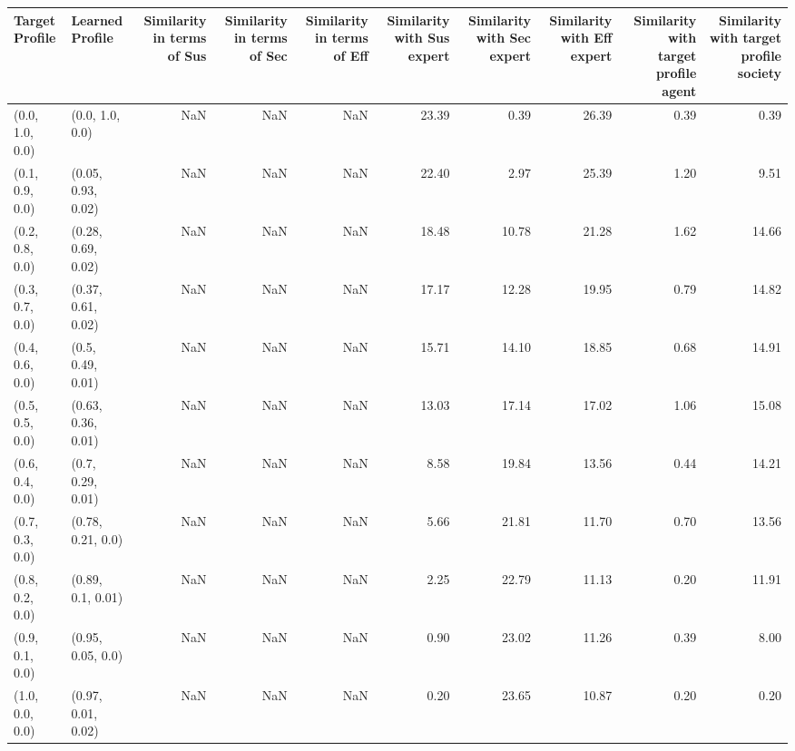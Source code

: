 \begin{tabular}{llrrrrrrrr}
\toprule
Target Profile & Learned Profile & Similarity in terms of Sus & Similarity in terms of Sec & Similarity in terms of Eff & Similarity with Sus expert & Similarity with Sec expert & Similarity with Eff expert & Similarity with target profile agent & Similarity with target profile society \\
\midrule
(0.0, 1.0, 0.0) & (0.0, 1.0, 0.0) & NaN & NaN & NaN & 23.39 & 0.39 & 26.39 & 0.39 & 0.39 \\
(0.1, 0.9, 0.0) & (0.05, 0.93, 0.02) & NaN & NaN & NaN & 22.40 & 2.97 & 25.39 & 1.20 & 9.51 \\
(0.2, 0.8, 0.0) & (0.28, 0.69, 0.02) & NaN & NaN & NaN & 18.48 & 10.78 & 21.28 & 1.62 & 14.66 \\
(0.3, 0.7, 0.0) & (0.37, 0.61, 0.02) & NaN & NaN & NaN & 17.17 & 12.28 & 19.95 & 0.79 & 14.82 \\
(0.4, 0.6, 0.0) & (0.5, 0.49, 0.01) & NaN & NaN & NaN & 15.71 & 14.10 & 18.85 & 0.68 & 14.91 \\
(0.5, 0.5, 0.0) & (0.63, 0.36, 0.01) & NaN & NaN & NaN & 13.03 & 17.14 & 17.02 & 1.06 & 15.08 \\
(0.6, 0.4, 0.0) & (0.7, 0.29, 0.01) & NaN & NaN & NaN & 8.58 & 19.84 & 13.56 & 0.44 & 14.21 \\
(0.7, 0.3, 0.0) & (0.78, 0.21, 0.0) & NaN & NaN & NaN & 5.66 & 21.81 & 11.70 & 0.70 & 13.56 \\
(0.8, 0.2, 0.0) & (0.89, 0.1, 0.01) & NaN & NaN & NaN & 2.25 & 22.79 & 11.13 & 0.20 & 11.91 \\
(0.9, 0.1, 0.0) & (0.95, 0.05, 0.0) & NaN & NaN & NaN & 0.90 & 23.02 & 11.26 & 0.39 & 8.00 \\
(1.0, 0.0, 0.0) & (0.97, 0.01, 0.02) & NaN & NaN & NaN & 0.20 & 23.65 & 10.87 & 0.20 & 0.20 \\
\bottomrule
\end{tabular}
